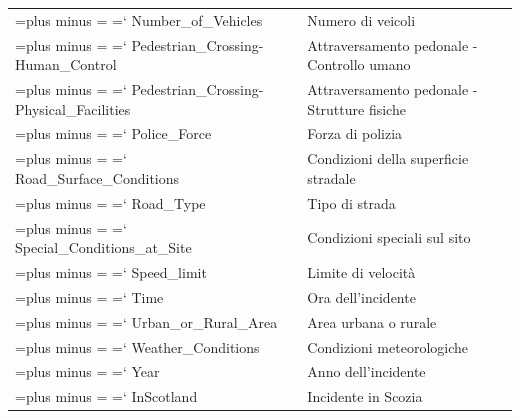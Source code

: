 \documentclass{article}
\renewcommand {\texttt}[1]{%
  \begingroup
    \spaceskip=\fontdimen2\font plus \fontdimen3\font minus \fontdimen4\font
    \xspaceskip=\fontdimen7\font\relax
    \ttfamily
    \hyphenchar\font=`\-
    #1
  \endgroup
}
\begin{document}
\begin{table}[h]
\begin{tabular}{l|l}
    \texttt{Number\_of\_Vehicles} & Numero di veicoli \\
    \texttt{Pedestrian\_Crossing-Human\_Control} & Attraversamento pedonale - Controllo umano \\
    \texttt{Pedestrian\_Crossing-Physical\_Facilities} & Attraversamento pedonale - Strutture fisiche \\
    \texttt{Police\_Force} & Forza di polizia \\
    \texttt{Road\_Surface\_Conditions} & Condizioni della superficie stradale \\
    \texttt{Road\_Type} & Tipo di strada \\
    \texttt{Special\_Conditions\_at\_Site} & Condizioni speciali sul sito \\
    \texttt{Speed\_limit} & Limite di velocità \\
    \texttt{Time} & Ora dell'incidente \\
    \texttt{Urban\_or\_Rural\_Area} & Area urbana o rurale \\
    \texttt{Weather\_Conditions} & Condizioni meteorologiche \\
    \texttt{Year} & Anno dell'incidente \\
    \texttt{InScotland} & Incidente in Scozia \\
    \bottomrule
  \end{tabular}
\end{table}
\end{document}

